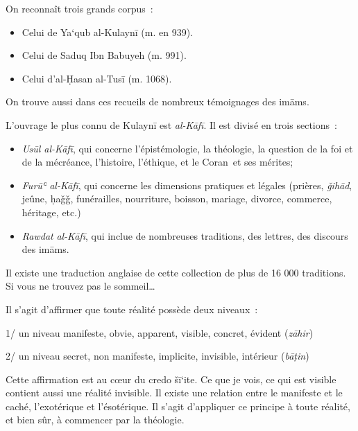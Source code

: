 On reconnaît trois grands corpus~:

\begin{itemize}
\item
  Celui de Ya`qub al-Kulaynī (m. en 939).
\item
  Celui de Saduq Ibn Babuyeh (m. 991).
\item
  Celui d'al-Ḥasan al-Tusī (m. 1068).
\end{itemize}

On trouve aussi dans ces recueils de nombreux témoignages des imāms.

L'ouvrage le plus connu de Kulaynī est \emph{al-Kāfī}. Il est divisé en
trois sections~:

\begin{itemize}
\item
  \emph{Usūl al-Kāfī}, qui concerne l'épistémologie, la théologie, la
  question de la foi et de la mécréance, l'histoire, l'éthique, et le
  Coran~et ses mérites;
\item
  \emph{Furūʿ al-Kāfī}, qui concerne les dimensions pratiques et légales
  (prières, \emph{ǧihād}, jeûne, ḥaǧǧ, funérailles, nourriture, boisson,
  mariage, divorce, commerce, héritage, etc.)
\item
  \emph{Rawdat} \emph{al-Kāfī}, qui inclue de nombreuses traditions, des
  lettres, des discours des imāms.
\end{itemize}

Il existe une traduction anglaise de cette collection de plus de 16 000
traditions. Si vous ne trouvez pas le sommeil\ldots{}



Il s'agit d'affirmer que toute réalité possède deux niveaux~:

1/ un niveau manifeste, obvie, apparent, visible, concret, évident
(\emph{zāhir})

2/ un niveau secret, non manifeste, implicite, invisible, intérieur
(\emph{bāṭin})

Cette affirmation est au cœur du credo šī`ite. Ce que je vois, ce qui
est visible contient aussi une réalité invisible. Il existe une relation
entre le manifeste et le caché, l'exotérique et l'ésotérique. Il s'agit
d'appliquer ce principe à toute réalité, et bien sûr, à commencer par la
théologie.

